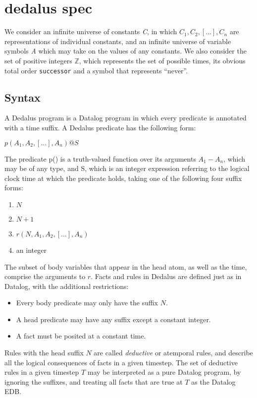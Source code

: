 \documentclass{acm_proc_article-sp-sigmod09}
\newcommand{\dedalus}[1]{\texttt{\fontsize{9pt}{9pt}\selectfont #1}}
\begin{document}
\section{dedalus spec}

We consider an infinite universe of constants \emph{C}, in which
$C_{1}, C_{2}, [...], C_{n}$ are representations of individual constants, and
an infinite universe of variable symbols \emph{A} which may take on the values
of any constants.   We also consider the set of positive integers $\mathbb{Z}$,
which represents the set of possible times, its obvious total order
\dedalus{successor} and a symbol that represents ``never''.

\subsection{Syntax}

A Dedalus program is a Datalog program in which every predicate is annotated with a time suffix.  A Dedalus predicate has the following form:

$p(A_{1}, A_{2}, [...], A_{n})@S$

The predicate p() is a truth-valued function over its arguments $A_{1} - A_{n}$, which may be of any type, and S, which is an integer expression 
referring to the logical clock time at which the predicate holds, taking one of the following four suffix forms:

\begin{enumerate}
\item $N$
\item $N + 1$
\item $r(N, A_{1}, A_{2}, [...], A_{n})$
\item an integer
\end{enumerate}

The subset of body variables that appear in the head atom, as well as the time,
comprise the arguments to $r$.  Facts and rules in Dedalus are 
defined just as in Datalog, with the additional restrictions:

\begin{itemize}
\item Every body predicate may only have the suffix $N$.
\item A head predicate may have any suffix except a constant integer.
\item A fact must be posited at a constant time.
\end{itemize}

Rules with the head suffix $N$ are called \emph{deductive} or atemporal rules,
and describe all the logical consequences of facts in a given timestep.  The
set of deductive rules in a given timestep $T$ may be interpreted as a pure
Datalog program, by ignoring the suffixes, and treating all facts that are true
at $T$ as the Datalog EDB.
\end{document}
